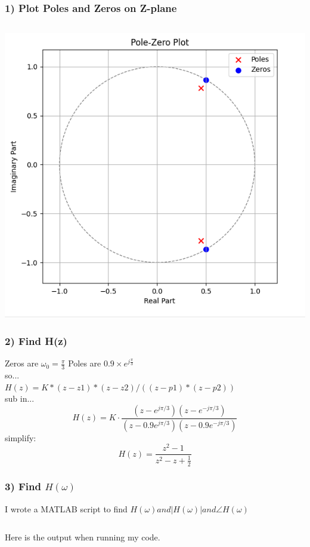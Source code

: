 \documentclass[12pt,letterpaper]{article}
\begin{document}
\subsubsection*{1) Plot Poles and Zeros on Z-plane}
\inputminted[frame=lines,framesep=2mm,baselinestretch=1.2,bgcolor=LightGray,breaklines,fontsize=\tiny,linenos]{python}{p1p1.py}
\includegraphics*[scale=0.5]{p1p1.png}
\newpage
\subsubsection*{2) Find H(z)}
Zeros are $\omega_0 = \frac{\pi}{3}$
Poles are $0.9 \times e^{j \frac{\pi}{3}}$
\\ so... \\
$H(z) = K * (z - z1) * (z - z2) / ((z - p1) * (z - p2))$
\\ sub in... \\
$$H(z) = K \cdot \frac{(z - e^{j\pi/3})(z - e^{-j\pi/3})}{(z - 0.9e^{j\pi/3})(z - 0.9e^{-j\pi/3})}$$
simplify:
\[
H(z) = \frac{z^2 - 1}{z^2 - z + \frac{1}{2}}
\]
\subsubsection*{3) Find $H(\omega)$ }
I wrote a MATLAB script to find $H(\omega) and |H(\omega)| and \angle H(\omega)$
\inputminted[frame=lines,framesep=2mm,baselinestretch=1.2,bgcolor=LightGray,breaklines,fontsize=\tiny,linenos]{matlab}{p1p3.m}
\newpage
Here is the output when running my code.
\inputminted[frame=lines,framesep=2mm,baselinestretch=1.2,bgcolor=LightGray,breaklines,fontsize=\tiny,linenos]{text}{p1p3.txt}
\end{document}
